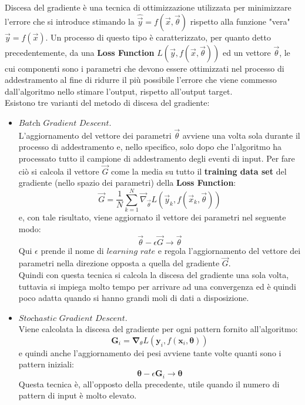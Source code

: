 Discesa del gradiente è una tecnica di ottimizzazione utilizzata per minimizzare l'errore che si introduce stimando la $\hat{\vec{y}} = f(\vec{x},\vec{\theta})$ rispetto alla funzione "vera" $\vec{y} = f(\vec{x})$. Un processo di questo tipo è caratterizzato, per quanto detto precedentemente, da una \textbf{Loss Function} $L(\vec{y},f(\vec{x},\vec{\theta}))$ ed un vettore $\vec{\theta}$, le cui componenti sono i parametri che devono essere ottimizzati nel processo di addestramento al fine di ridurre il più possibile l'errore che viene commesso dall'algoritmo nello stimare l'output, rispetto all'output target.\\
Esistono tre varianti del metodo di discesa del gradiente:

\begin{itemize}
	\item $\textit{Batch Gradient Descent}$. \\
	 L'aggiornamento del vettore dei parametri $\vec{\theta}$ avviene una volta sola durante il processo di addestramento e, nello specifico, solo dopo che l'algoritmo ha processato tutto il campione di addestramento degli eventi di input.  Per fare ciò si calcola il vettore $\vec{G}$ come la media su tutto il \textbf{training data set} del gradiente (nello spazio dei parametri) della \textbf{Loss Function}:
	 	\begin{equation}
	 	\vec{G} = \frac{1}{N} \sum_{k=1}^{N} \vec{\nabla}_{\vec{\theta}} L(\vec{y}_k,f(\vec{x}_k,\vec{\theta})) 
	 	\end{equation}
	 e, con tale risultato, viene aggiornato il vettore dei parametri nel seguente modo: 
	 	\begin{equation}
	 	\vec{\theta} - \epsilon\vec{G} \rightarrow \vec{\theta}
	 	\end{equation}
	 Qui $\epsilon$ prende il nome di $\textit{learning rate}$ e regola l'aggiornamento del vettore dei parametri nella direzione opposta a quella del gradiente $\vec{G}$.\\
	 Quindi con questa tecnica si calcola la discesa del gradiente una sola volta, tuttavia si impiega molto tempo per arrivare ad una convergenza ed è quindi poco adatta quando si hanno grandi moli di dati a disposizione. \\
	 
	\item $\textit{Stochastic Gradient Descent}$. \\
	Viene calcolata la discesa del gradiente per ogni pattern fornito all'algoritmo:
	 	\begin{equation}
		\textbf{G}_i =  \boldsymbol{\nabla}_\theta L(\textbf{y}_i,f(\textbf{x}_i,\bm{\theta})) 
		\end{equation}
	e quindi anche l'aggiornamento dei pesi avviene tante volte quanti sono i pattern iniziali:
		\begin{equation}
		\bm{\theta} - \epsilon\textbf{G}_i \rightarrow \bm{\theta}
		\end{equation}
	Questa tecnica è, all'opposto della precedente, utile quando il numero di pattern di input è molto elevato. \\
		

\end{itemize}

